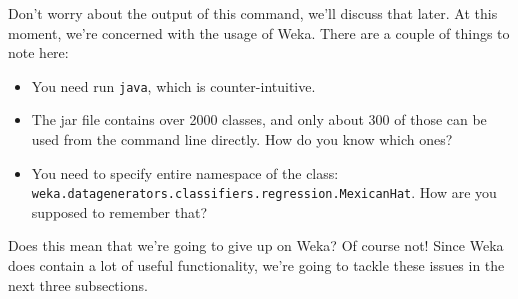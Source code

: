 \documentclass[
]{book}
\newenvironment{Shaded}{\begin{snugshade}}{\end{snugshade}}
\newcommand{\ExtensionTok}[1]{#1}
\newcommand{\KeywordTok}[1]{\textcolor[rgb]{0.13,0.29,0.53}{\textbf{#1}}}
\newcommand{\NormalTok}[1]{#1}
\newcommand{\OperatorTok}[1]{\textcolor[rgb]{0.81,0.36,0.00}{\textbf{#1}}}
\providecommand{\tightlist}{%
  \setlength{\itemsep}{0pt}\setlength{\parskip}{0pt}}
\theoremstyle{definition}
\theoremstyle{definition}
\theoremstyle{definition}
\theoremstyle{remark}
\begin{document}
\begin{Shaded}
\end{Shaded}

Don't worry about the output of this command, we'll discuss that later. At this moment, we're concerned with the usage of Weka. There are a couple of things to note here:

\begin{itemize}
\tightlist
\item
  You need run \texttt{java}, which is counter-intuitive.
\item
  The jar file contains over 2000 classes, and only about 300 of those can be used from the command line directly. How do you know which ones?
\item
  You need to specify entire namespace of the class: \texttt{weka.datagenerators.classifiers.regression.MexicanHat}. How are you supposed to remember that?
\end{itemize}

Does this mean that we're going to give up on Weka? Of course not! Since Weka does contain a lot of useful functionality, we're going to tackle these issues in the next three subsections.
\end{document}
